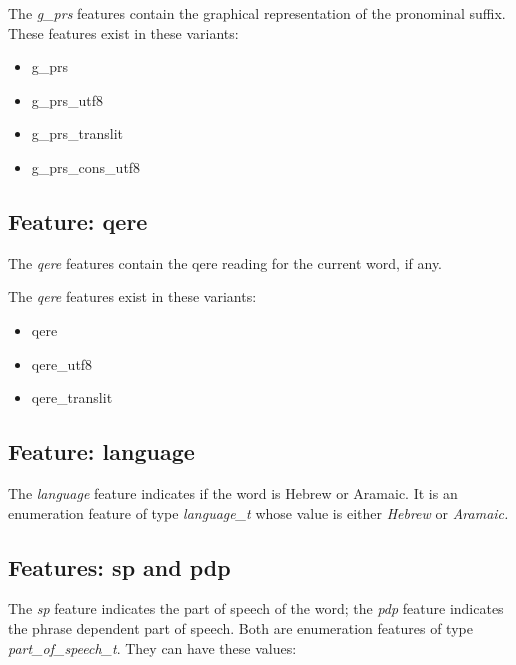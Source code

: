 \documentclass[11pt,oneside,a4paper]{memoir}
\begin{document}
The \emph{g\_prs} features contain the graphical representation of the pronominal suffix.
These features exist in these variants:

\begin{itemize}
\item g\_prs
\item g\_prs\_utf8
\item g\_prs\_translit
\item g\_prs\_cons\_utf8
\end{itemize}


\subsection{Feature: qere}

The \emph{qere} features contain the qere reading for the current word, if any.

The \emph{qere} features exist in these variants:

\begin{itemize}
\item qere
\item qere\_utf8
\item qere\_translit
\end{itemize}

\subsection{Feature: language}

The \emph{language} feature indicates if the word is Hebrew or Aramaic. It is an enumeration feature
of type \emph{language\_t} whose value is either \emph{Hebrew} or \emph{Aramaic.}

\subsection{Features: sp and pdp}

The \emph{sp} feature indicates the part of speech of the word; the \emph{pdp} feature indicates the
phrase dependent part of speech. Both are enumeration features of type \emph{part\_of\_speech\_t}.
They can have these values:
\end{document}
